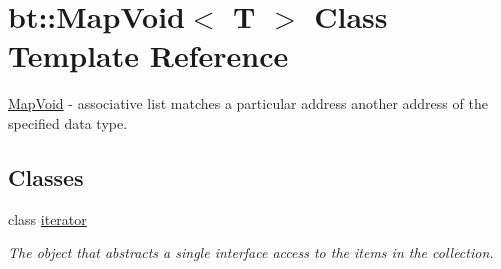 \hypertarget{classbt_1_1_map_void}{\section{bt\-:\-:Map\-Void$<$ T $>$ Class Template Reference}
\label{classbt_1_1_map_void}
}


\hyperlink{classbt_1_1_map_void}{Map\-Void} -\/ associative list matches a particular address another address of the specified data type.  


\subsection*{Classes}
\begin{DoxyCompactItemize}
\item 
class \hyperlink{classbt_1_1_map_void_1_1iterator}{iterator}
\begin{DoxyCompactList}\small\item\em The object that abstracts a single interface access to the items in the collection. \end{DoxyCompactList}\end{DoxyCompactItemize}
